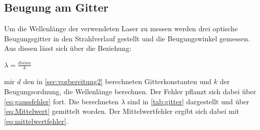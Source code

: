   \subsection{Beugung am Gitter}    
  Um die Wellenlänge der verwendeten Laser zu messen werden drei optische Beugungsgitter in den
  Strahlverlauf gestellt und die Beugungswinkel gemessen. Aus diesen lässt sich über die Beziehung:
   \begin{center}
     $\lambda=\frac{d sin\alpha}{k}$
   \end{center}   
mir $d$ den in \autoref{sec:vorbereitung2} berechneten Gitterkonstanten und $k$ der Beugungsordnung,
die Wellenlänge berechnen. Der Fehler pflanzt sich dabei über \autoref{eq:gaussfehler} fort. Die berechneten
$\lambda$ sind in \autoref{tab:gitter} dargestellt und über \autoref{eq:Mittelwert} gemittelt worden.
Der Mittelwertfehler ergibt sich dabei mit \autoref{eq:mittelwertfehler}.
